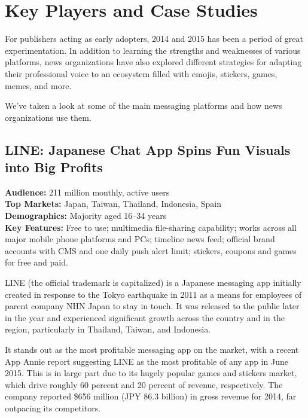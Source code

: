 \documentclass[notoc, symmetric, nobib, nols]{towcenter-guideto-book}
\newcommand{\blankpage}{\newpage\hbox{}\thispagestyle{empty}\newpage}
\begin{document}
\chapter{Key Players and Case Studies}
\blankpage
For publishers acting as early adopters, 2014 and 2015 has been a period of great experimentation. In addition to learning the strengths and weaknesses of various platforms, news organizations have also explored different strategies for adapting their professional voice to an ecosystem filled with emojis, stickers, games, memes, and more.   

We've taken a look at some of the main messaging platforms and how news organizations use them.

\section[LINE: Japanese Chat App Spins Fun Visuals into Big Profits]{LINE: Japanese Chat App Spins Fun Visuals \protect\newline into Big Profits}


\begin{framed}
  \noindent\textbf{Audience:} 211 million monthly, active users\\
  \noindent\textbf{Top Markets:} Japan, Taiwan, Thailand, Indonesia, Spain\\
  \noindent\textbf{Demographics:} Majority aged 16--34 years \\
  \noindent\textbf{Key Features:} Free to use; multimedia file-sharing capability; works across all major mobile phone platforms and PCs; timeline news feed; official brand accounts with CMS and one daily push alert limit; stickers, coupons and games for free and paid.
\end{framed}

\vspace{\baselineskip}
LINE (the official trademark is capitalized) is a Japanese messaging app initially created in response to the Tokyo earthquake in 2011 as a means for employees of parent company NHN Japan to stay in touch. It was released to the public later in the year and experienced significant growth across the country and in the region, particularly in Thailand, Taiwan, and Indonesia. 

It stands out as the most profitable messaging app on the market, with a recent App Annie report suggesting LINE as the most profitable of any app in June 2015.\autocite{AppAnnie} This is in large part due to its hugely popular games and stickers market, which drive roughly 60 percent and 20 percent of revenue, respectively. The company reported \$656 million (JPY 86.3 billion) in gross revenue for 2014, far outpacing its competitors.\autocite{Line2014results} 
\end{document}
